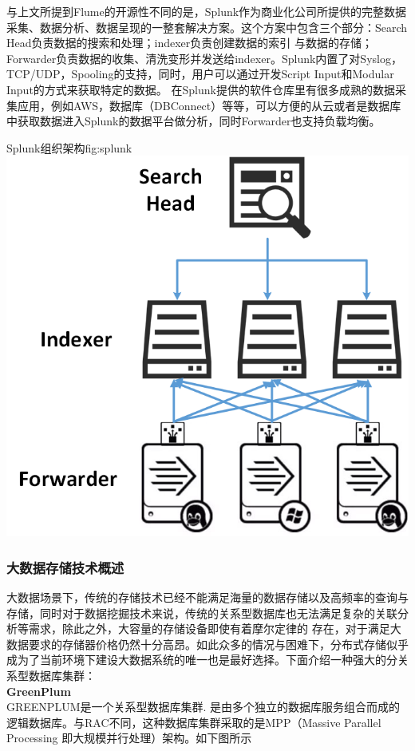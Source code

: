 \documentclass{HustGraduPaper}
\begin{document}
    与上文所提到Flume的开源性不同的是，Splunk作为商业化公司所提供的完整数据采集、数据分析、数据呈现的一整套解决方案。这个方案中包含三个部分：Search Head负责数据的搜索和处理；indexer负责创建数据的索引
    与数据的存储；Forwarder负责数据的收集、清洗变形并发送给indexer。Splunk内置了对Syslog，TCP/UDP，Spooling的支持，同时，用户可以通过开发Script Input和Modular Input的方式来获取特定的数据。
    在Splunk提供的软件仓库里有很多成熟的数据采集应用，例如AWS，数据库（DBConnect）等等，可以方便的从云或者是数据库中获取数据进入Splunk的数据平台做分析，同时Forwarder也支持负载均衡。
    
    \begin{generalfig}[htb]{Splunk组织架构}{fig:splunk} 
        \includegraphics[scale = 0.4]{Figures/splunk.png}
    \end{generalfig}

    \subsubsection{大数据存储技术概述}
    大数据场景下，传统的存储技术已经不能满足海量的数据存储以及高频率的查询与存储，同时对于数据挖掘技术来说，传统的关系型数据库也无法满足复杂的关联分析等需求，除此之外，大容量的存储设备即使有着摩尔定律的
    存在，对于满足大数据要求的存储器价格仍然十分高昂。如此众多的情况与困难下，分布式存储似乎成为了当前环境下建设大数据系统的唯一也是最好选择。下面介绍一种强大的分关系型数据库集群：\\
    {\songti \bfseries GreenPlum\\}
    GREENPLUM是一个关系型数据库集群. 是由多个独立的数据库服务组合而成的逻辑数据库。与RAC不同，这种数据库集群采取的是MPP（Massive Parallel Processing 即大规模并行处理）架构。如下图所示
\end{document}
